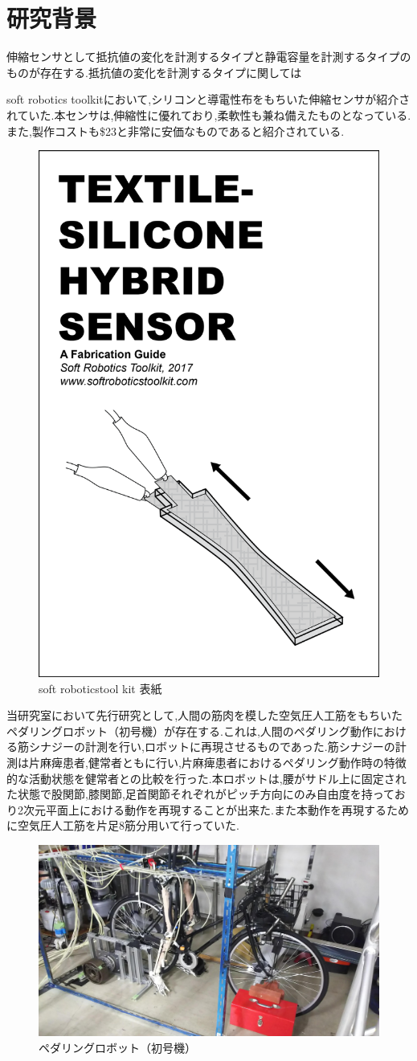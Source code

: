 \section{研究背景}
伸縮センサとして抵抗値の変化を計測するタイプと静電容量を計測するタイプのものが存在する.抵抗値の変化を計測するタイプに関しては

soft robotics toolkit\cite{MITSoftRobot}において,シリコンと導電性布をもちいた伸縮センサが紹介されていた.本センサは,伸縮性に優れており,柔軟性も兼ね備えたものとなっている.また,製作コストも\$23と非常に安価なものであると紹介されている.
\begin{figure}[h]
    \begin{center}
        \includegraphics[width=0.275\columnwidth,clip]{Photo/BackGround/MITSoftRobotics.eps}
        \caption{soft roboticstool kit 表紙\cite{MITSoftRobot}}
        \label{MITSoftRobot表紙}
    \end{center}
\end{figure}

当研究室において先行研究として,人間の筋肉を模した空気圧人工筋をもちいたペダリングロボット（初号機）が存在する.これは,人間のペダリング動作における筋シナジーの計測を行い,ロボットに再現させるものであった.筋シナジーの計測は片麻痺患者,健常者ともに行い,片麻痺患者におけるペダリング動作時の特徴的な活動状態を健常者との比較を行った.本ロボットは,腰がサドル上に固定された状態で股関節,膝関節,足首関節それぞれがピッチ方向にのみ自由度を持っており2次元平面上における動作を再現することが出来た.また本動作を再現するために空気圧人工筋を片足8筋分用いて行っていた.
\begin{figure}[h]
 \begin{center}
  \includegraphics[width=0.5\columnwidth,clip]{Photo/BackGround/1st.eps}
  \caption{ペダリングロボット（初号機）}
  \label{初号機}
  \end{center}
  \end{figure}

